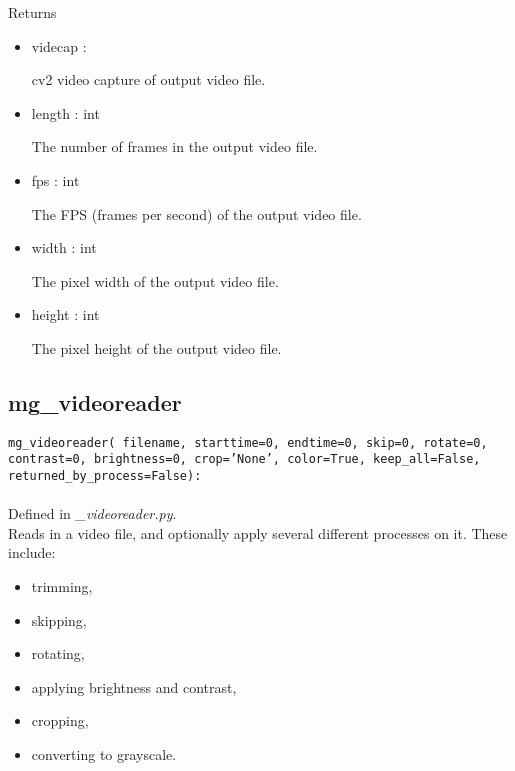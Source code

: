 \documentclass[9pt]{extarticle}
\def\code#1{\texttt{#1}}
\begin{document}
\noindent Returns
\begin{itemize}
\item videcap :

cv2 video capture of output video file.

\item length : int

The number of frames in the output video file.

\item fps : int

The FPS (frames per second) of the output video file.

\item width : int

The pixel width of the output video file. 

\item height : int

The pixel height of the output video file. 
\end{itemize}



\subsection{mg\_videoreader}

\code{mg\_videoreader(
    filename,
    starttime=0,
    endtime=0,
    skip=0,
    rotate=0,
    contrast=0,
    brightness=0,
    crop='None',
    color=True,
    keep\_all=False,
    returned\_by\_process=False):}
\\\\
Defined in \textit{\_videoreader.py}.\\
Reads in a video file, and optionally apply several different 
processes on it. These include:
\begin{itemize}
\item trimming,
\item skipping,
\item rotating,
\item applying brightness and contrast,
\item cropping,
\item converting to grayscale.
\end{itemize}
\end{document}
